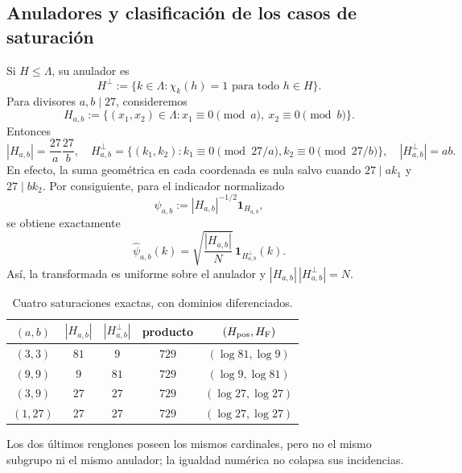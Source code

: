 \subsection{Anuladores y clasificación de los casos de saturación}
\label{v:n19:sec:anuladores}

Si \(H\le\Lambda\), su anulador es
\begin{equation}
 H^\perp:=\{k\in\Lambda:\chi_k(h)=1\text{ para todo }h\in H\}.
 \label{v:n19:eq:anulador}
\end{equation}
Para divisores \(a,b\mid27\), consideremos
\begin{equation}
 H_{a,b}:=\{(x_1,x_2)\in\Lambda:
 x_1\equiv0\pmod a,\ x_2\equiv0\pmod b\}.
 \label{v:n19:eq:subgrupo-rectangular}
\end{equation}
Entonces
\begin{equation}
 |H_{a,b}|=\frac{27}{a}\frac{27}{b},
 \quad
 H_{a,b}^{\perp}
 =\{(k_1,k_2):k_1\equiv0\pmod{27/a},
                  k_2\equiv0\pmod{27/b}\},
 \quad |H_{a,b}^{\perp}|=ab.
 \label{v:n19:eq:anulador-explicito}
\end{equation}
En efecto, la suma geométrica en cada coordenada es nula salvo cuando
\(27\mid ak_1\) y \(27\mid bk_2\). Por consiguiente, para el indicador
normalizado
\begin{equation}
 \psi_{a,b}:=|H_{a,b}|^{-1/2}\mathbf1_{H_{a,b}},
 \label{v:n19:eq:indicador-normalizado}
\end{equation}
se obtiene exactamente
\begin{equation}
 \widehat\psi_{a,b}(k)
 =\sqrt{\frac{|H_{a,b}|}{N}}\,
   \mathbf1_{H_{a,b}^{\perp}}(k).
 \label{v:n19:eq:fourier-indicador}
\end{equation}
Así, la transformada es uniforme sobre el anulador y
\(|H_{a,b}|\,|H_{a,b}^{\perp}|=N\).

\begin{table}[htbp]
\centering
\caption{Cuatro saturaciones exactas, con dominios diferenciados.}
\label{v:n19:tab:saturaciones}
\begin{tabular}{@{}ccccc@{}}
\toprule
\((a,b)\) & \(|H_{a,b}|\) & \(|H_{a,b}^{\perp}|\) & producto
 & \((H_{\rm pos},H_{\rm F})\) \\
\midrule
\((3,3)\)  & \(81\) & \(9\)  & \(729\) & \((\log81,\log9)\) \\
\((9,9)\)  & \(9\)  & \(81\) & \(729\) & \((\log9,\log81)\) \\
\((3,9)\)  & \(27\) & \(27\) & \(729\) & \((\log27,\log27)\) \\
\((1,27)\) & \(27\) & \(27\) & \(729\) & \((\log27,\log27)\) \\
\bottomrule
\end{tabular}
\end{table}
Los dos últimos renglones poseen los mismos cardinales, pero no el
mismo subgrupo ni el mismo anulador; la igualdad numérica no colapsa sus
incidencias.

